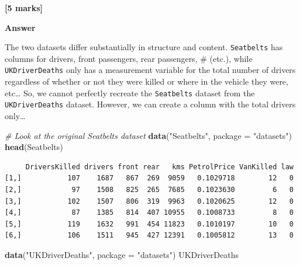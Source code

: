 \documentclass[
  10t,
]{article}
\newenvironment{Shaded}{\begin{snugshade}}{\end{snugshade}}
\newcommand{\AttributeTok}[1]{\textcolor[rgb]{0.13,0.29,0.53}{#1}}
\newcommand{\CommentTok}[1]{\textcolor[rgb]{0.56,0.35,0.01}{\textit{#1}}}
\newcommand{\FunctionTok}[1]{\textcolor[rgb]{0.13,0.29,0.53}{\textbf{#1}}}
\newcommand{\NormalTok}[1]{#1}
\newcommand{\StringTok}[1]{\textcolor[rgb]{0.31,0.60,0.02}{#1}}
\let\oldtexttt\texttt
\renewcommand{\texttt}[1]{\oldtexttt{\small #1}}
\begin{document}
\textbf{{[}5 marks{]}}

\textbf{Answer}

The two datasets differ substantially in structure and content.
\texttt{Seatbelts} has columns for drivers, front passengers, rear
passengers, \# (etc.), while \texttt{UKDriverDeaths} only has a
measurement variable for the total number of drivers regardless of
whether or not they were killed or where in the vehicle they were,
etc\ldots{} So, we cannot perfectly recreate the \texttt{Seatbelts}
dataset from the \texttt{UKDriverDeaths} dataset. However, we can create
a column with the total drivers only\ldots{}

\begin{Shaded}
\begin{Highlighting}[]
\CommentTok{\# Look at the original \textasciigrave{}Seatbelts\textasciigrave{} dataset}
\FunctionTok{data}\NormalTok{(}\StringTok{"Seatbelts"}\NormalTok{, }\AttributeTok{package =} \StringTok{"datasets"}\NormalTok{)}
\FunctionTok{head}\NormalTok{(Seatbelts)}
\end{Highlighting}
\end{Shaded}

\begin{verbatim}
     DriversKilled drivers front rear   kms PetrolPrice VanKilled law
[1,]           107    1687   867  269  9059   0.1029718        12   0
[2,]            97    1508   825  265  7685   0.1023630         6   0
[3,]           102    1507   806  319  9963   0.1020625        12   0
[4,]            87    1385   814  407 10955   0.1008733         8   0
[5,]           119    1632   991  454 11823   0.1010197        10   0
[6,]           106    1511   945  427 12391   0.1005812        13   0
\end{verbatim}

\begin{Shaded}
\begin{Highlighting}[]
\FunctionTok{data}\NormalTok{(}\StringTok{"UKDriverDeaths"}\NormalTok{, }\AttributeTok{package =} \StringTok{"datasets"}\NormalTok{)}
\NormalTok{UKDriverDeaths}
\end{Highlighting}
\end{Shaded}
\end{document}
